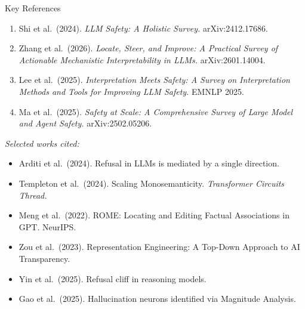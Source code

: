 \begin{frame}{Key References}
  \vspace*{0.1cm}
  \footnotesize
  \begin{enumerate}\setlength\itemsep{4pt}
    \item[\navy{\textcircled{1}}] Shi et al.\ (2024).
      \textit{LLM Safety: A Holistic Survey.}
      arXiv:2412.17686.

    \item[\tealc{\textcircled{2}}] Zhang et al.\ (2026).
      \textit{Locate, Steer, and Improve: A Practical Survey of
      Actionable Mechanistic Interpretability in LLMs.}
      arXiv:2601.14004.

    \item[\greenc{\textcircled{3}}] Lee et al.\ (2025).
      \textit{Interpretation Meets Safety: A Survey on Interpretation Methods
      and Tools for Improving LLM Safety.}
      EMNLP 2025.

    \item[\redc{\textcircled{4}}] Ma et al.\ (2025).
      \textit{Safety at Scale: A Comprehensive Survey of Large Model and Agent Safety.}
      arXiv:2502.05206.
  \end{enumerate}

  \vspace{0.5em}
  {\color{UCRmgray}\small\textit{Selected works cited:}}
  \vspace{0.2em}
  \begin{itemize}\scriptsize\color{UCRdark}\setlength\itemsep{2pt}
    \item Arditi et al.\ (2024). Refusal in LLMs is mediated by a single direction.
    \item Templeton et al.\ (2024). Scaling Monosemanticity. \textit{Transformer Circuits Thread.}
    \item Meng et al.\ (2022). ROME: Locating and Editing Factual Associations in GPT. NeurIPS.
    \item Zou et al.\ (2023). Representation Engineering: A Top-Down Approach to AI Transparency.
    \item Yin et al.\ (2025). Refusal cliff in reasoning models.
    \item Gao et al.\ (2025). Hallucination neurons identified via Magnitude Analysis.
  \end{itemize}
\end{frame}
